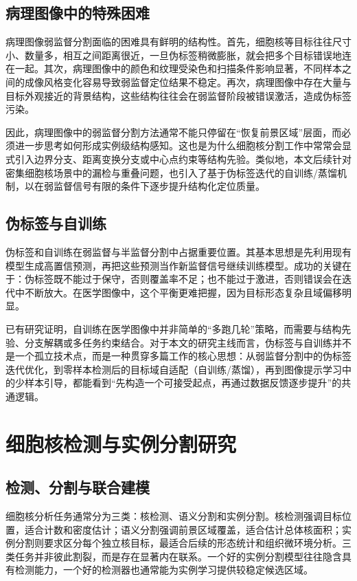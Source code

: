 \subsection{病理图像中的特殊困难}
病理图像弱监督分割面临的困难具有鲜明的结构性。首先，细胞核等目标往往尺寸小、数量多，相互之间距离很近，一旦伪标签稍微膨胀，就会把多个目标错误地连在一起。其次，病理图像中的颜色和纹理受染色和扫描条件影响显著，不同样本之间的成像风格变化容易导致弱监督定位结果不稳定。再次，病理图像中存在大量与目标外观接近的背景结构，这些结构往往会在弱监督阶段被错误激活，造成伪标签污染。

因此，病理图像中的弱监督分割方法通常不能只停留在“恢复前景区域”层面，而必须进一步思考如何形成实例级结构感知。这也是为什么细胞核分割工作中常常会显式引入边界分支、距离变换分支或中心点约束等结构先验。类似地，本文后续针对密集细胞核场景中的漏检与重叠问题，也引入了基于伪标签迭代的自训练/蒸馏机制，以在弱监督信号有限的条件下逐步提升结构化定位质量。

\subsection{伪标签与自训练}
伪标签和自训练在弱监督与半监督分割中占据重要位置。其基本思想是先利用现有模型生成高置信预测，再把这些预测当作新监督信号继续训练模型。成功的关键在于：伪标签既不能过于保守，否则覆盖率不足；也不能过于激进，否则错误会在迭代中不断放大。在医学图像中，这个平衡更难把握，因为目标形态复杂且域偏移明显。

已有研究证明，自训练在医学图像中并非简单的“多跑几轮”策略，而需要与结构先验、分支解耦或多任务约束结合。对于本文的研究主线而言，伪标签与自训练并不是一个孤立技术点，而是一种贯穿多篇工作的核心思想：从弱监督分割中的伪标签迭代优化，到零样本检测后的目标域自适配（自训练/蒸馏），再到图像提示学习中的少样本引导，都能看到“先构造一个可接受起点，再通过数据反馈逐步提升”的共通逻辑。

\section{细胞核检测与实例分割研究}

\subsection{检测、分割与联合建模}
细胞核分析任务通常分为三类：核检测、语义分割和实例分割。核检测强调目标位置，适合计数和密度估计；语义分割强调前景区域覆盖，适合估计总体核面积；实例分割则要求区分每个独立核目标，最适合后续的形态统计和组织微环境分析。三类任务并非彼此割裂，而是存在显著内在联系。一个好的实例分割模型往往隐含具有检测能力，一个好的检测器也通常能为实例学习提供较稳定候选区域。

